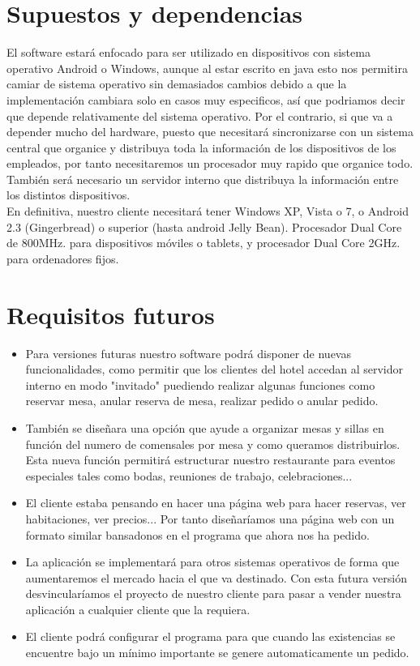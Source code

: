 \documentclass[spanish,a4paper,11pt, twoside]{report}	%
\begin{document}
\section{Supuestos y dependencias}	
	El software estará enfocado para ser utilizado en dispositivos con sistema operativo Android o Windows, aunque al estar escrito en java esto nos permitira camiar de sistema operativo sin demasiados cambios debido a que la implementación cambiara solo en casos muy especificos, así que podriamos decir que depende relativamente del sistema operativo.  Por el contrario, si que va a depender mucho del hardware, puesto que necesitará sincronizarse con un sistema central que organice y distribuya toda la información de los dispositivos de los empleados, por tanto necesitaremos un procesador muy rapido que organice todo. También será necesario un servidor interno que distribuya la información entre los distintos dispositivos.	\\

En definitiva,  nuestro cliente necesitará tener Windows XP, Vista o 7, o Android 2.3 (Gingerbread) o superior (hasta android Jelly Bean).
Procesador Dual Core de 800MHz. para dispositivos móviles o tablets, y procesador Dual Core 2GHz. para ordenadores fijos.

\section{Requisitos futuros}
	\begin{itemize}
		\item Para versiones futuras nuestro software podrá disponer de nuevas funcionalidades, como permitir que los clientes del hotel accedan al servidor interno en modo "invitado" puediendo realizar algunas funciones como reservar mesa, anular reserva de mesa, realizar pedido o anular pedido.

		\item También se diseñara una opción que ayude a organizar mesas y sillas en función del numero de comensales por mesa y como queramos distribuirlos. Esta nueva función permitirá estructurar nuestro restaurante para eventos especiales tales como bodas, reuniones de trabajo, celebraciones...

		\item El cliente estaba pensando en hacer una página web para hacer reservas, ver habitaciones, ver precios... Por tanto diseñaríamos una página web con un formato similar bansadonos en el programa que ahora nos ha pedido.

		\item La aplicación se implementará para otros sistemas operativos de forma que aumentaremos el mercado hacia el que va destinado. Con esta futura versión desvincularíamos el proyecto de nuestro cliente para pasar a vender nuestra aplicación a cualquier cliente que la requiera.
		
		\item El cliente podrá configurar el programa para que cuando las existencias se encuentre bajo un mínimo importante se genere automaticamente un pedido.
	\end{itemize}
\end{document}
